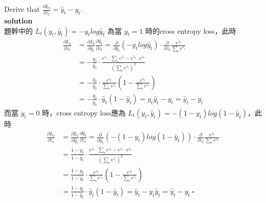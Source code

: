 \documentclass{article}
\begin{document}
Derive that $\frac{\partial L_t}{\partial z_t} = {\hat y}_t - y_t$.\\

\noindent
{\bf \large solution}\\

\noindent
題幹中的 $ L_t(y_t, {\hat y}_t) = −y_t log {\hat y}_t$ 為當 $y_t = 1$ 時的cross entropy loss，此時\\
\begin{align*}
    \frac{\partial L_t}{\partial z_t} &= \frac{\partial L_t}{\partial {\hat y}_t} \frac{\partial {\hat y}_t}{\partial z_t} = \frac{\partial}{\partial {\hat y}_t} (-y_t log {\hat y}_t) \cdot \frac{\partial}{\partial z_t} \frac{e^{z_t}}{\sum_i e^{z_i}}\\
    &= -\frac{y_t}{{\hat y}_t} \cdot \frac{e^{z_t} \cdot \sum_i e^{z_i} - e^{z_t} \cdot e^{z_t}}{(\sum_i e^{z_i})^2}\\
    &= -\frac{y_t}{{\hat y}_t} \cdot \frac{e^{z_t}}{\sum_i e^{z_i}} (1 - \frac{e^{z_t}}{\sum_i e^{z_i}})\\
    &= -\frac{y_t}{{\hat y}_t} \cdot {\hat y}_t (1 - {\hat y}_t) = y_t {\hat y}_t - y_t = {\hat y}_t - y_t
\end{align*}
而當 $y_t = 0$ 時，cross entropy loss應為 $L_t(y_t, {\hat y}_t) = −(1 - y_t) log (1 - {\hat y}_t)$，此時
\begin{align*}
    \frac{\partial L_t}{\partial z_t} &= \frac{\partial L_t}{\partial {\hat y}_t} \frac{\partial {\hat y}_t}{\partial z_t} = \frac{\partial}{\partial {\hat y}_t} (-(1 - y_t) log (1 - {\hat y}_t)) \cdot \frac{\partial}{\partial z_t} \frac{e^{z_t}}{\sum_i e^{z_i}}\\
    &= \frac{1 - y_t}{1 - {\hat y}_t} \cdot \frac{e^{z_t} \cdot \sum_i e^{z_i} - e^{z_t} \cdot e^{z_t}}{(\sum_i e^{z_i})^2}\\
    &= \frac{1 - y_t}{1 - {\hat y}_t} \cdot \frac{e^{z_t}}{\sum_i e^{z_i}} (1 - \frac{e^{z_t}}{\sum_i e^{z_i}})\\
    &= \frac{1 - y_t}{1 - {\hat y}_t} \cdot {\hat y}_t (1 - {\hat y}_t) = {\hat y}_t - y_t {\hat y}_t = {\hat y}_t - y_t\ \square
\end{align*}
\end{document}
